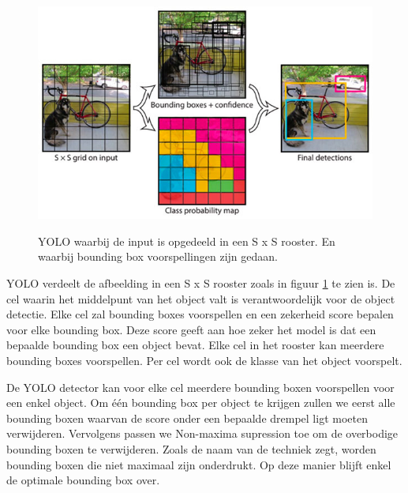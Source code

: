 \begin{figure}[!ht]
	\centering
	\includegraphics[width=0.60\linewidth]{fig/YOLO.jpg}
	\caption{YOLO waarbij de input is opgedeeld in een S x S rooster. 
	En waarbij bounding box voorspellingen zijn gedaan.}
	\label{fig:yolo}
	\cite{redmon_you_2016}
\end{figure}

YOLO \cite{redmon_you_2016} verdeelt de afbeelding in een S x S rooster zoals in figuur \ref{fig:yolo} te zien is. 
De cel waarin het middelpunt van het object valt is verantwoordelijk voor de object detectie.
Elke cel zal bounding boxes voorspellen en een zekerheid score bepalen voor elke bounding box. 
Deze score geeft aan hoe zeker het model is dat een bepaalde bounding box een object bevat.
Elke cel in het rooster kan meerdere bounding boxes voorspellen.
Per cel wordt ook de klasse van het object voorspelt.

De YOLO detector kan voor elke cel meerdere bounding boxen voorspellen voor een enkel object.
Om \'e\'en bounding box per object te krijgen zullen we eerst alle bounding boxen waarvan de score onder een bepaalde drempel ligt moeten verwijderen.
Vervolgens passen we Non-maxima supression toe om de overbodige bounding boxen te verwijderen. 
Zoals de naam van de techniek zegt, worden bounding boxen die niet maximaal zijn onderdrukt.
Op deze manier blijft enkel de optimale bounding box over.



